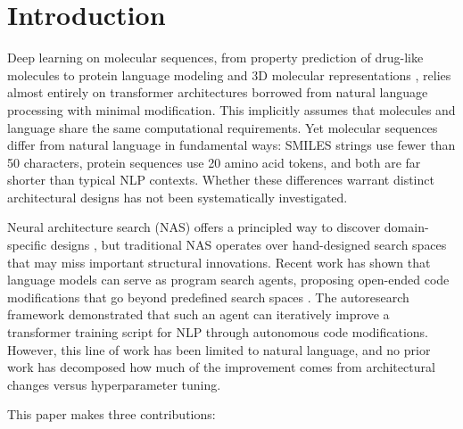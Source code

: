 \section{Introduction}
\label{sec:introduction}

Deep learning on molecular sequences, from property prediction of drug-like molecules \citep{chithrananda2020chemberta,ross2022molformer} to protein language modeling \citep{lin2023esm2} and 3D molecular representations \citep{zhou2023unimol}, relies almost entirely on transformer architectures borrowed from natural language processing with minimal modification. This implicitly assumes that molecules and language share the same computational requirements. Yet molecular sequences differ from natural language in fundamental ways: SMILES strings use fewer than 50 characters, protein sequences use 20 amino acid tokens, and both are far shorter than typical NLP contexts. Whether these differences warrant distinct architectural designs has not been systematically investigated.

Neural architecture search (NAS) offers a principled way to discover domain-specific designs \citep{elsken2019nas}, but traditional NAS operates over hand-designed search spaces that may miss important structural innovations. Recent work has shown that language models can serve as program search agents, proposing open-ended code modifications that go beyond predefined search spaces \citep{chen2023evoprompting,romeraparedes2024funsearch,hu2025lmsearcher}. The autoresearch framework \citep{karpathy2026autoresearch} demonstrated that such an agent can iteratively improve a transformer training script for NLP through autonomous code modifications. However, this line of work has been limited to natural language, and no prior work has decomposed how much of the improvement comes from architectural changes versus hyperparameter tuning.

This paper makes three contributions:

